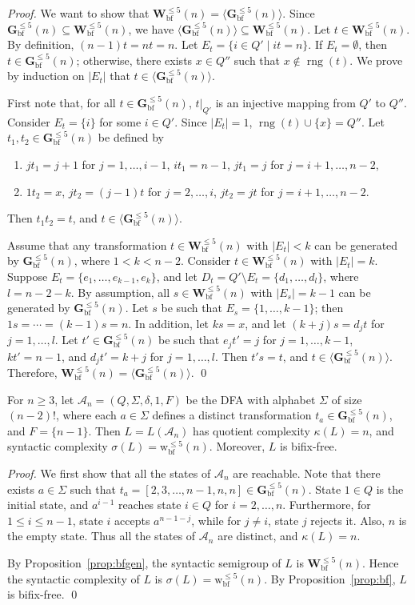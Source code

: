 \documentclass{llncs}
\renewcommand{\le}{\leqslant}
\renewcommand{\ge}{\geqslant}
\newcommand{\Sig}{\Sigma}
\newcommand{\be}{\begin{enumerate}}
\newcommand{\ee}{\end{enumerate}}
\newcommand{\timg}{\mathop{\mbox{rng}}}
\newcommand{\cA}{{\mathcal A}}
\newcommand{\Vbf}{\mathbf{W}^{\le 5}_{\mathrm{bf}}}
\newcommand{\Gbf}{\mathbf{G}^{\le 5}_{\mathrm{bf}}}
\newcommand{\vbf}{{\mathrm{w}^{\le 5}_{\mathrm{bf}}}}
\begin{document}
\begin{proof}\label{proof:bfgen}
We want to show that $\Vbf(n) = \langle \Gbf(n) \rangle$. Since $\Gbf(n) \subseteq \Vbf(n)$, we have $\langle \Gbf(n) \rangle \subseteq \Vbf(n)$. 
Let $t \in \Vbf(n)$. By definition, $(n-1)t = nt = n$. Let $E_{t} = \{i \in Q' \mid it = n\}$. If $E_{t} = \emptyset$, then $t \in \Gbf(n)$; 
otherwise,  there exists $x \in Q''$ such that $x \not\in \timg(t)$. We prove by induction on $|E_{t}|$ that $t \in \langle \Gbf(n) \rangle$. 


First note that, for all $t \in \Gbf(n)$, $t|_{Q'}$ is an injective mapping from $Q'$ to $Q''$. Consider  $E_{t} = \{i\}$ for some $i \in Q'$. 
Since $|E_{t}| = 1$, $\timg(t) \cup \{x\} = Q''$. Let $t_1,t_2 \in \Gbf(n)$ be defined by
\be
\item $jt_1 = j+1$ for $j = 1,\ldots,i-1$, $it_1 = n-1$, $jt_1 = j$ for $j = i+1,\ldots,n-2$, 
\item $1t_2 = x$, $jt_2 = (j-1)t$ for $j = 2,\ldots,i$, $jt_2 = jt$ for $j = i+1,\ldots,n-2$. 
\ee
Then $t_1t_2 = t$, and $t \in \langle \Gbf(n) \rangle$.
\goodbreak

Assume that any transformation $t \in \Vbf(n)$ with $|E_{t}| < k$ can be generated by $\Gbf(n)$, where $1 < k < n-2$. 
Consider $t \in \Vbf(n)$ with $|E_{t}| = k$. 
Suppose $E_{t} = \{e_1,\ldots,e_{k-1},e_k\}$, and let $D_{t} = Q' \setminus E_{t} = \{d_1,\ldots,d_l\}$, where $l = n - 2 - k$. 
By assumption, all $s \in \Vbf(n)$ with $|E_{s}| = k-1$ can be generated by $\Gbf(n)$. 
Let $s$ be such that $E_{s} = \{1,\ldots,k-1\}$; then $1s = \cdots = (k-1)s = n$. In addition, let $ks = x$, and let $(k+j)s = d_jt$ for $j = 1,\ldots,l$. Let $t' \in \Gbf(n)$ be such that $e_jt' = j$ for $j = 1,\ldots,k-1$, $kt' = n-1$, and $d_jt' = k+j$ for $j = 1,\ldots,l$. Then $t's = t$, and $t \in \langle \Gbf(n) \rangle$.
Therefore, $\Vbf(n) = \langle \Gbf(n) \rangle$. \qed
\end{proof}

\begin{theorem}\label{thm:bfaut}
For $n \ge 3$, let $\cA_n = (Q,\Sig,\delta,1,F)$ be the DFA 
with alphabet $\Sig$ of size $(n-2)!$, where each $a \in \Sig$ defines a distinct transformation $t_a \in \Gbf(n)$, and $F = \{n-1\}$. 
Then $L = L(\cA_n)$ has quotient complexity $\kappa(L) = n$, and syntactic complexity $\sigma(L) = \vbf(n)$. 
Moreover, $L$ is bifix-free.
\end{theorem}

\begin{proof}\label{proof:bfaut}
We first show that all the states of $\cA_n$ are reachable. 
Note that there exists $a \in \Sig$ such that $t_a = [2,3,\ldots,n-1,n,n] \in \Gbf(n)$. 
State $1 \in Q$ is the initial state, and
 $a^{i-1}$ reaches  state $i \in Q$ for $i = 2,\ldots,n$. 
Furthermore, for $1 \leq i \leq n-1$, state $i$ accepts  $ a^{n-1-j}$, while for $j \neq i$,  state $j$ rejects it. Also, $n$ is the empty state. Thus all the states of $\cA_n$ are distinct, and $\kappa(L) = n$. 

By Proposition~\ref{prop:bfgen}, the syntactic semigroup of $L$ is $\Vbf(n)$. Hence the syntactic complexity of $L$ is $\sigma(L) = \vbf(n)$. By Proposition~\ref{prop:bf}, $L$ is bifix-free. \qed
\end{proof}
\end{document}
